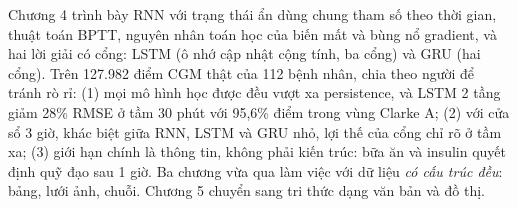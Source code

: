 Chương 4 trình bày RNN với trạng thái ẩn dùng chung tham số theo thời gian, thuật toán BPTT, nguyên nhân toán học của biến mất và bùng nổ gradient, và hai lời giải có cổng: LSTM (ô nhớ cập nhật cộng tính, ba cổng) và GRU (hai cổng). Trên 127.982 điểm CGM thật của 112 bệnh nhân, chia theo người để tránh rò rỉ: (1) mọi mô hình học được đều vượt xa persistence, và LSTM 2 tầng giảm 28\% RMSE ở tầm 30 phút với 95,6\% điểm trong vùng Clarke A; (2) với cửa sổ 3 giờ, khác biệt giữa RNN, LSTM và GRU nhỏ, lợi thế của cổng chỉ rõ ở tầm xa; (3) giới hạn chính là thông tin, không phải kiến trúc: bữa ăn và insulin quyết định quỹ đạo sau 1 giờ. Ba chương vừa qua làm việc với dữ liệu \emph{có cấu trúc đều}: bảng, lưới ảnh, chuỗi. Chương 5 chuyển sang tri thức dạng văn bản và đồ thị.
